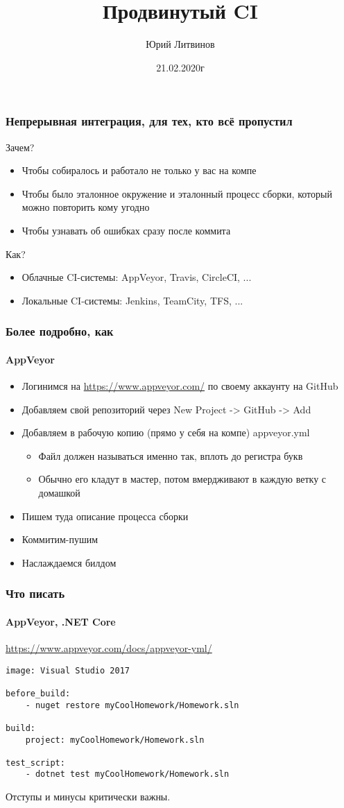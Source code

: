 \documentclass[xetex,mathserif,serif]{beamer}
\title{Продвинутый CI}
\author{Юрий Литвинов}
\date{21.02.2020г}
\begin{document}
	
	\frame{\titlepage}

	\begin{frame}
		\frametitle{Непрерывная интеграция, для тех, кто всё пропустил}
		Зачем?
		\begin{itemize}
			\item Чтобы собиралось и работало не только у вас на компе
			\item Чтобы было эталонное окружение и эталонный процесс сборки, который можно повторить кому угодно
			\item Чтобы узнавать об ошибках сразу после коммита
		\end{itemize}
		Как?
		\begin{itemize}
			\item Облачные CI-системы: AppVeyor, Travis, CircleCI, ...
			\item Локальные CI-системы: Jenkins, TeamCity, TFS, ...
		\end{itemize}
	\end{frame}

	\begin{frame}
		\frametitle{Более подробно, как}
		\framesubtitle{AppVeyor}
		\begin{itemize}
			\item Логинимся на \url{https://www.appveyor.com/} по своему аккаунту на GitHub
			\item Добавляем свой репозиторий через New Project -> GitHub -> Add
			\item Добавляем в рабочую копию (прямо у себя на компе) appveyor.yml
			\begin{itemize}
				\item Файл должен называться именно так, вплоть до регистра букв
				\item Обычно его кладут в мастер, потом вмердживают в каждую ветку с домашкой
			\end{itemize}
			\item Пишем туда описание процесса сборки
			\item Коммитим-пушим
			\item Наслаждаемся билдом
		\end{itemize}
	\end{frame}

	\begin{frame}[fragile]
		\frametitle{Что писать}
		\framesubtitle{AppVeyor, .NET Core}
		\url{https://www.appveyor.com/docs/appveyor-yml/}
		\begin{verbatim}
image: Visual Studio 2017 

before_build: 
    - nuget restore myCoolHomework/Homework.sln

build: 
    project: myCoolHomework/Homework.sln

test_script: 
    - dotnet test myCoolHomework/Homework.sln
		\end{verbatim}
		Отступы и минусы критически важны.
	\end{frame}
\end{document}
